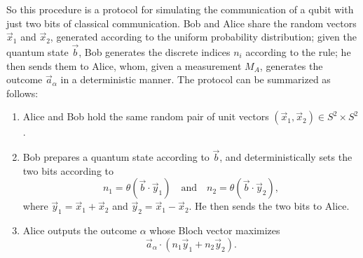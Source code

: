 \documentclass[12pt,draft]{article}
\theoremstyle{definition}
\theoremstyle{plain}
\begin{document}
    So this procedure is a protocol for simulating the
    communication of a qubit with just two bits of classical
    communication. {\color{blue}
        Bob and Alice share the random vectors $\vec x_1$
        and $\vec x_2$, generated according to the uniform
        probability distribution; given the quantum state
        $\vec b$, Bob generates the discrete indices $n_i$
        according to the rule; he then sends them to Alice,
        whom, given a measurement $M_A$, generates the
        outcome $\vec a_\alpha$ in a deterministic manner.
    } The protocol can be summarized as follows:
    \begin{enumerate}
        \item Alice and Bob hold the same random pair of
            unit vectors $(\vec x_1, \vec x_2) \in S^2
            \times S^2$.
        \item Bob prepares a quantum state according to
            $\vec b$, and deterministically sets the two
            bits according to
            \begin{equation}
                n_1 = \theta(\vec b \cdot \vec y_1)
                \quad\text{and}\quad
                n_2 = \theta(\vec b \cdot \vec y_2),
            \end{equation}
            where $\vec y_1 = \vec x_1 + \vec x_2$ and $\vec
            y_2 = \vec x_1 - \vec x_2$. He then sends the
            two bits to Alice.
        \item Alice outputs the outcome $\alpha$ whose Bloch
            vector maximizes 
            \begin{equation}
                \vec a_\alpha \cdot (n_1 \vec y_1 + n_2 \vec
                y_2).
            \end{equation}
    \end{enumerate}
\end{document}
